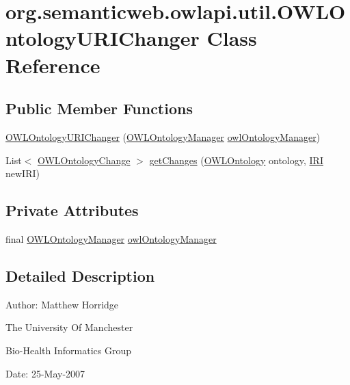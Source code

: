 \hypertarget{classorg_1_1semanticweb_1_1owlapi_1_1util_1_1_o_w_l_ontology_u_r_i_changer}{\section{org.\-semanticweb.\-owlapi.\-util.\-O\-W\-L\-Ontology\-U\-R\-I\-Changer Class Reference}
\label{classorg_1_1semanticweb_1_1owlapi_1_1util_1_1_o_w_l_ontology_u_r_i_changer}
}
\subsection*{Public Member Functions}
\begin{DoxyCompactItemize}
\item 
\hyperlink{classorg_1_1semanticweb_1_1owlapi_1_1util_1_1_o_w_l_ontology_u_r_i_changer_a6c3f226334ec34ae2cab049ed90ce1e8}{O\-W\-L\-Ontology\-U\-R\-I\-Changer} (\hyperlink{interfaceorg_1_1semanticweb_1_1owlapi_1_1model_1_1_o_w_l_ontology_manager}{O\-W\-L\-Ontology\-Manager} \hyperlink{classorg_1_1semanticweb_1_1owlapi_1_1util_1_1_o_w_l_ontology_u_r_i_changer_a87c6a8c479f5853c9b9500414be9e803}{owl\-Ontology\-Manager})
\item 
List$<$ \hyperlink{classorg_1_1semanticweb_1_1owlapi_1_1model_1_1_o_w_l_ontology_change}{O\-W\-L\-Ontology\-Change} $>$ \hyperlink{classorg_1_1semanticweb_1_1owlapi_1_1util_1_1_o_w_l_ontology_u_r_i_changer_a427b059a557be8c05b3e08d213b0529c}{get\-Changes} (\hyperlink{interfaceorg_1_1semanticweb_1_1owlapi_1_1model_1_1_o_w_l_ontology}{O\-W\-L\-Ontology} ontology, \hyperlink{classorg_1_1semanticweb_1_1owlapi_1_1model_1_1_i_r_i}{I\-R\-I} new\-I\-R\-I)
\end{DoxyCompactItemize}
\subsection*{Private Attributes}
\begin{DoxyCompactItemize}
\item 
final \hyperlink{interfaceorg_1_1semanticweb_1_1owlapi_1_1model_1_1_o_w_l_ontology_manager}{O\-W\-L\-Ontology\-Manager} \hyperlink{classorg_1_1semanticweb_1_1owlapi_1_1util_1_1_o_w_l_ontology_u_r_i_changer_a87c6a8c479f5853c9b9500414be9e803}{owl\-Ontology\-Manager}
\end{DoxyCompactItemize}


\subsection{Detailed Description}
Author\-: Matthew Horridge\par
 The University Of Manchester\par
 Bio-\/\-Health Informatics Group\par
 Date\-: 25-\/\-May-\/2007\par
\par
 

